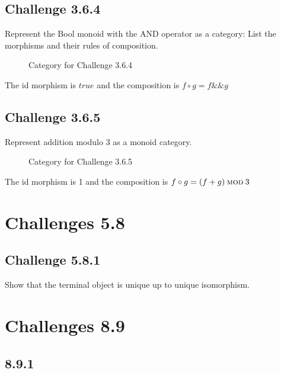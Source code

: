 \documentclass[11pt]{article}
\begin{document}
    \subsection*{Challenge 3.6.4}
        Represent the Bool monoid with the AND operator as a category:
        List the morphisms and their rules of composition.\\
        \begin{figure*}
            \centering
            \caption{Category for Challenge 3.6.4}
        \end{figure*}
        The id morphism is $true$ and the composition is $f \circ g = f \&\& g$

    \subsection*{Challenge 3.6.5}
        Represent addition modulo 3 as a monoid category. \\
        \begin{figure*}
            \centering
            \caption{Category for Challenge 3.6.5}
        \end{figure*}
        The id morphism is 1 and the composition is $f \circ g = (f + g)\:\textsc{mod}\: 3$

\section*{Challenges 5.8}
    \subsection*{Challenge 5.8.1}
        Show that the terminal object is unique up to unique isomorphism.\\

    
\section*{Challenges 8.9}

    \subsection*{8.9.1}
\end{document}
